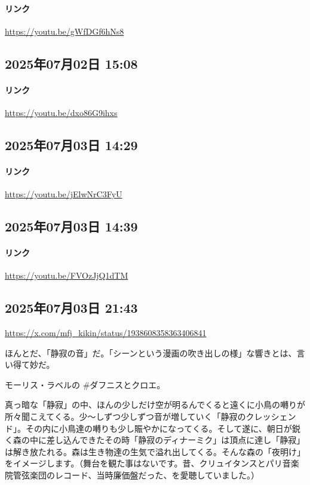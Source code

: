 \paragraph{リンク}
\url{https://youtu.be/gWfDGf6hNs8}

\subsection*{2025年07月02日 15:08}

\paragraph{リンク}
\url{https://youtu.be/dxo86G9ihxs}

\subsection*{2025年07月03日 14:29}

\paragraph{リンク}
\url{https://youtu.be/jElwNrC3FyU}

\subsection*{2025年07月03日 14:39}

\paragraph{リンク}
\url{https://youtu.be/FVOzJjQ1dTM}

\subsection*{2025年07月03日 21:43}

\url{https://x.com/mfj_kikin/status/1938608358363406841}

ほんとだ、「静寂の音」だ。「シーンという漫画の吹き出しの様」な響きとは、言い得て妙だ。

モーリス・ラベルの \#ダフニスとクロエ。

真っ暗な「静寂」の中、ほんの少しだけ空が明るんでくると遠くに小鳥の囀りが所々聞こえてくる。少〜しずつ少しずつ音が増していく「静寂のクレッシェンド」。その内に小鳥達の囀りも少し賑やかになってくる。そして遂に、朝日が鋭く森の中に差し込んできたその時「静寂のディナーミク」は頂点に達し「静寂」は解き放たれる。森は生き物達の生気で溢れ出してくる。そんな森の「夜明け」をイメージします。（舞台を観た事はないです。昔、クリュイタンスとパリ音楽院管弦楽団のレコード、当時廉価盤だった、を愛聴していました。）

